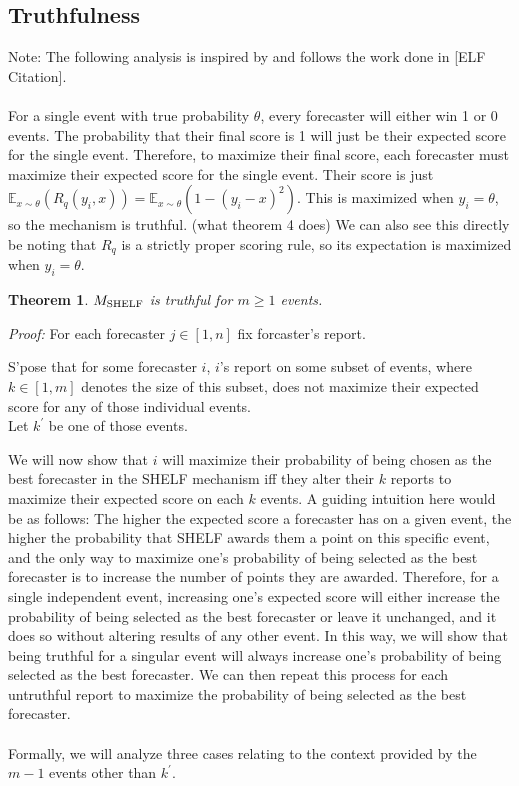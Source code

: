 \documentclass[letterpaper,12pt]{article}
\newcommand{\E}{\mathbb{E}}
\newcommand{\1}{\mathbbm{1}}
\newtheorem{theorem}{Theorem}
\begin{document}
\subsection{Truthfulness}
Note: The following analysis is inspired by and follows the work done in [ELF Citation].\\\\
For a single event with true probability $\theta$, every forecaster will either win 1 or 0 events. The probability that their final score is 1 will just be their expected score for the single event. Therefore, to maximize their final score, each forecaster must maximize their expected score for the single event. Their score is just $\E_{x \sim \theta}(R_q(y_i, x)) = \E_{x \sim \theta}(1 - (y_i - x)^2)$. This is maximized when $y_i = \theta$, so the mechanism is truthful. (what theorem 4 does) We can also see this directly be noting that $R_q$ is a strictly proper scoring rule, so its expectation is maximized when $y_i = \theta$. 

\begin{theorem}
  \label{shelf_truthful}
    $M_{\mathrm{SHELF}}$ is truthful for $m \geq 1$ events.
\end{theorem}
\emph{Proof:} For each forecaster $j \in [1, n]$ fix forcaster's report.

S'pose that for some forecaster $i$, $i$'s report on some subset of events, where $k \in [1, m]$ denotes the size of this subset, does not maximize their expected score for any of those individual events.\\
Let $k^\prime$ be one of those events.

We will now show that $i$ will maximize their probability of being chosen as the best forecaster in the SHELF mechanism iff they alter their $k$ reports to maximize their expected score on each $k$ events. A guiding intuition here would be as follows: The higher the expected score a forecaster has on a given event, the higher the probability that SHELF awards them a point on this specific event, and the only way to maximize one's probability of being selected as the best forecaster is to increase the number of points they are awarded. Therefore, for a single independent event, increasing one's expected score will either increase the probability of being selected as the best forecaster or leave it unchanged, and it does so without altering results of any other event. In this way, we will show that being truthful for a singular event will always increase one's probability of being selected as the best forecaster. We can then repeat this process for each untruthful report to maximize the probability of being selected as the best forecaster.\\\\
Formally, we will analyze three cases relating to the context provided by the $m - 1$ events other than $k^\prime$.
\end{document}
